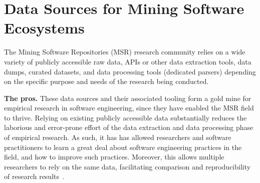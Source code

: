 
\newpage


\section{Data Sources for Mining Software Ecosystems}

The Mining Software Repositories (MSR) research community relies on a wide variety of publicly accessible raw data, APIs or other data extraction tools, data dumps, curated datasets, and data processing tools  (\eg dedicated parsers) depending on the specific purpose and needs of the research being conducted.

\smallskip \textbf{The pros.}
These data sources and their associated tooling form a gold mine for empirical research in software engineering, since they have enabled the MSR field to thrive. 
Relying on existing publicly accessible data substantially reduces the laborious and error-prone effort of the data extraction and data processing phase of empirical research.
As such, it has has allowed researchers and software practitioners to learn a great deal about software engineering practices in the field, and how to improve such practices.
Moreover, this allows multiple researchers to rely on the same data, facilitating comparison and reproducibility of research results~\cite{Gonzalez-Barahona2012}.

